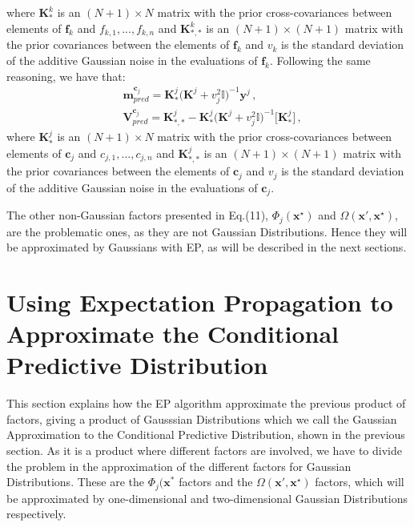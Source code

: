 where $\boldsymbol{K}_{*}^{k}$ is an $(N + 1) \times N$ matrix with the prior cross-covariances between elements of $\boldsymbol{f}_k$ and $f_{k,1},...,f_{k,n}$ and $\boldsymbol{K}_{*,*}^{k}$ is an $(N + 1) \times (N + 1)$ matrix with the prior covariances between the elements of $\boldsymbol{f}_k$ and $v_k$ is the standard deviation of the additive Gaussian noise in the evaluations of $\boldsymbol{f}_k$. Following the same reasoning, we have that:
\begin{align}
    &
    \boldsymbol{m}_{pred}^{\boldsymbol{c}_{j}} = \boldsymbol{K}_{*}^{j}\big(\boldsymbol{K}^{j} + v_{j}^{2}        \mathds{I}\big)^{-1}\boldsymbol{y}^j\,, \nonumber \\
    & 
    \boldsymbol{V}_{pred}^{\boldsymbol{c}_{j}} = \boldsymbol{K}_{*,*}^{j} - \boldsymbol{K}_{*}^{j}\big(\boldsymbol{K}^{j} + v_{j}^{2}        \mathds{I}\big)^{-1}\big[\boldsymbol{K}_{*}^{j}\big]\,,
\end{align}
where $\boldsymbol{K}_{*}^{j}$ is an $(N + 1) \times N$ matrix with the prior cross-covariances between elements of $\boldsymbol{c}_j$ and $c_{j,1},...,c_{j,n}$ and $\boldsymbol{K}_{*,*}^{j}$ is an $(N + 1) \times (N + 1)$ matrix with the prior covariances between the elements of $\boldsymbol{c}_j$ and $v_j$ is the standard deviation of the additive Gaussian noise in the evaluations of $\boldsymbol{c}_j$.

The other non-Gaussian factors presented in Eq.(11), $\Phi_j(\textbf{x}^{\star})$ and  $\Omega(\textbf{x}',\textbf{x}^{\star})$, are the problematic ones, as they are not Gaussian Distributions. Hence they will be approximated by Gaussians with EP, as will be described in the next sections.

\section{Using Expectation Propagation to Approximate the Conditional Predictive Distribution}

This section explains how the EP algorithm approximate the previous product of factors, giving a product of Gausssian Distributions which we call the Gaussian Approximation to the Conditional Predictive Distribution, shown in the previous section. As it is a product where different factors are involved, we have to divide the problem in the approximation of the different factors for Gaussian Distributions. These are the $\Phi_j(\boldsymbol{x}^*$ factors and the $\Omega(\textbf{x}',\textbf{x}^{\star})$ factors, which will be approximated by one-dimensional and two-dimensional Gaussian Distributions respectively.

